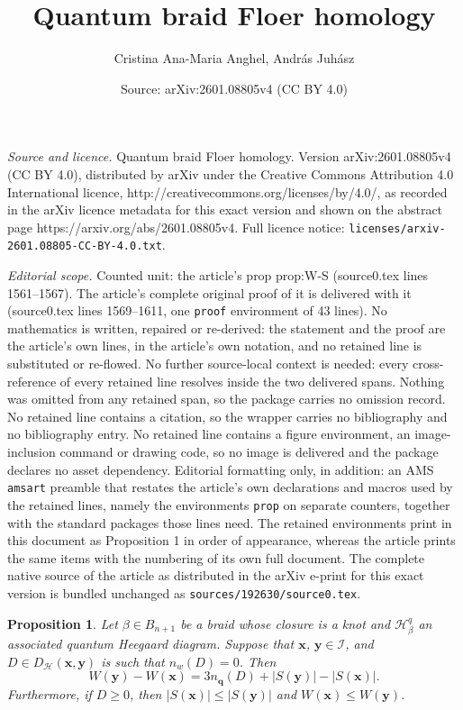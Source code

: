 \documentclass[10pt,a4paper]{amsart}
\title{Quantum braid Floer homology}
\author{Cristina Ana-Maria Anghel, Andr\'as Juh\'asz}
\date{Source: arXiv:2601.08805v4 (CC BY 4.0)}
\newtheorem{prop}{Proposition}
\newcommand{\cH}{\mathcal{H}}
\newcommand{\cI}{\mathcal{I}}
\newcommand{\qs}{\boldsymbol{q}}
\newcommand{\xs}{\boldsymbol{x}}
\newcommand{\ys}{\boldsymbol{y}}
\begin{document}
\maketitle

\noindent\emph{Source and licence.} Quantum braid Floer homology. Version arXiv:2601.08805v4 (CC BY 4.0), distributed by arXiv under the Creative Commons Attribution 4.0 International licence, http://creativecommons.org/licenses/by/4.0/, as recorded in the arXiv licence metadata for this exact version and shown on the abstract page https://arxiv.org/abs/2601.08805v4. Full licence notice: \texttt{licenses/arxiv-2601.08805-CC-BY-4.0.txt}.\par\smallskip

\noindent\textit{Editorial scope.} Counted unit: the article's prop prop:W-S (source0.tex lines 1561--1567). The article's complete original proof of it is delivered with it (source0.tex lines 1569--1611, one \texttt{proof} environment of 43 lines). No mathematics is written, repaired or re-derived: the statement and the proof are the article's own lines, in the article's own notation, and no retained line is substituted or re-flowed.  No further source-local context is needed: every cross-reference of every retained line resolves inside the two delivered spans.  Nothing was omitted from any retained span, so the package carries no omission record.  No retained line contains a citation, so the wrapper carries no bibliography and no bibliography entry.  No retained line contains a figure environment, an image-inclusion command or drawing code, so no image is delivered and the package declares no asset dependency.  Editorial formatting only, in addition: an AMS \texttt{amsart} preamble that restates the article's own declarations and macros used by the retained lines, namely the environments \texttt{prop} on separate counters, together with the standard packages those lines need.  The retained environments print in this document as Proposition 1 in order of appearance, whereas the article prints the same items with the numbering of its own full document.  The complete native source of the article as distributed in the arXiv e-print for this exact version is bundled unchanged as \texttt{sources/192630/source0.tex}.
\begin{prop}\label{prop:W-S}
    Let $\beta \in B_{n+1}$ be a braid whose closure is a knot and $\cH^q_\beta$ an associated quantum Heegaard diagram. Suppose that $\xs$, $\ys \in \cI$, and $D \in D_{\cH}(\xs,\ys)$ is such that $n_w(D) = 0$. Then
    \begin{equation}\label{eqn:W-S}
    W(\ys) - W(\xs) = 3n_{\qs}(D) + |S(\ys)| - |S(\xs)|.
    \end{equation}
    Furthermore, if $D \ge 0$, then $|S(\xs)| \le |S(\ys)|$ and $W(\xs) \le W(\ys)$.
\end{prop}
\end{document}
